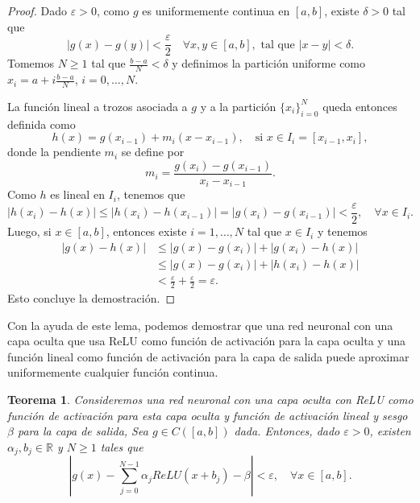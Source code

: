 \documentclass[12pt, a4paper]{amsbook}
\newcommand{\ve}{\varepsilon}
\newcommand{\R}{{\mathbb R}}
\newtheorem{teo}{Teorema}[section]
\theoremstyle{remark}
\theoremstyle{definition}
\numberwithin{section}{chapter}
\numberwithin{subsection}{section}
\numberwithin{equation}{section}
\numberwithin{figure}{chapter}
\begin{document}
\begin{proof}
Dado $\ve>0$, como $g$ es uniformemente continua en $[a, b]$, existe $\delta>0$ tal que
$$
|g(x)-g(y)|<\frac{\ve}{2} \quad \forall x, y\in [a, b], \text{ tal que }  |x-y|<\delta.
$$
Tomemos $N\ge 1$ tal que $\frac{b-a}{N}<\delta$ y definimos la partición uniforme como $x_i = a+i\frac{b-a}{N}$, $i=0,\dots, N$.

La función lineal a trozos asociada a $g$ y a la partición $\{x_i\}_{i=0}^N$ queda entonces definida como
$$
h(x) = g(x_{i-1}) + m_i(x-x_{i-1}), \quad \text{si } x\in I_i = [x_{i-1}, x_i],
$$
donde la pendiente $m_i$ se define por
$$
m_i = \frac{g(x_i)-g(x_{i-1})}{x_i - x_{i-1}}.
$$
Como $h$ es lineal en $I_i$, tenemos que
$$
|h(x_i) - h(x)|\le |h(x_i)-h(x_{i-1})| = |g(x_i)-g(x_{i-1})| < \frac{\ve}{2},\quad \forall x\in I_i.
$$
Luego, si $x\in [a, b]$, entonces existe $i=1,\dots,N$ tal que $x\in I_i$ y tenemos
\begin{align*}
|g(x)-h(x)| & \le |g(x)-g(x_i)| + |g(x_i)-h(x)|\\
& \le |g(x)-g(x_i)| + |h(x_i) - h(x)|\\
& < \frac{\ve}{2} + \frac{\ve}{2} = \ve.
\end{align*}
Esto concluye la demostración.
\end{proof}

Con la ayuda de este lema, podemos demostrar que una red neuronal con una capa oculta que usa ReLU como función de activación para la capa oculta y una función lineal como función de activación para la capa de salida puede aproximar uniformemente cualquier función continua.
\begin{teo}\label{teo.ReLU}
Consideremos una red neuronal con una capa oculta con ReLU como función de activación para esta capa oculta y función de activación lineal y sesgo $\beta$ para la capa de salida, Sea $g\in C([a, b])$ dada. Entonces, dado $\ve>0$, existen $\alpha_j, b_j\in \R$ y $N\ge 1$ tales que
$$
\left| g(x) - \sum_{j=0}^{N-1} \alpha_j ReLU(x+b_j) - \beta\right| < \ve,\quad \forall x\in [a, b].
$$
\end{teo}
\end{document}
